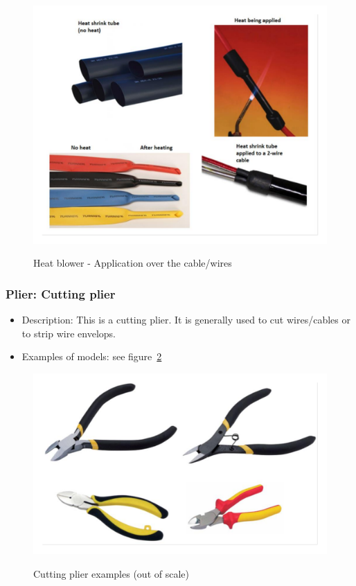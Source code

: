 \begin{figure}
  \centering
  \includegraphics[angle=90,width=1\columnwidth]{figs/body02/FIGDEVICEUTILITYHEATSHRINK2.pdf}\\
  \caption[Heat blower - Application over the cable/wires]{Heat blower - Application over the cable/wires}
  \label{FIG:DEVICEUTILITYHEATSHRINK2}
\end{figure}
\subsubsection{Plier: Cutting plier} \label{DEVICE:TOOLPLIERCUTTING}
\begin{itemize}
  \item Description: This is a cutting plier. It is generally used to cut wires/cables or to strip wire envelops.
  \item Examples of models: see figure~\ref{FIG:DEVICETOOLPLIERCUTTING}
\end{itemize}
\begin{figure}
  \centering
  \includegraphics[angle=90,width=1\columnwidth]{figs/body02/FIGDEVICETOOLPLIERCUTTING.pdf}\\
  \caption[Cutting plier examples (out of scale)]{Cutting plier examples (out of scale)}
  \label{FIG:DEVICETOOLPLIERCUTTING}
\end{figure}
